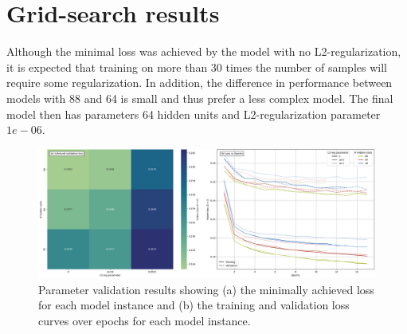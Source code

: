 \chapter{Grid-search results}

Although the minimal loss was achieved by the model with no L2-regularization, it is expected that training on more than 30 times the number of samples will require some regularization. In addition, the difference in performance between models with 88 and 64 is small and thus prefer a less complex model. The final model then has parameters 64 hidden units and L2-regularization parameter $1e-06$. 

\begin{figure}[h]
\centering
\includegraphics[width=\textwidth]{images/param_val.png}
\caption{Parameter validation results showing (a) the minimally achieved loss for each model instance and (b) the training and validation loss curves over epochs for each model instance.}
\end{figure}



